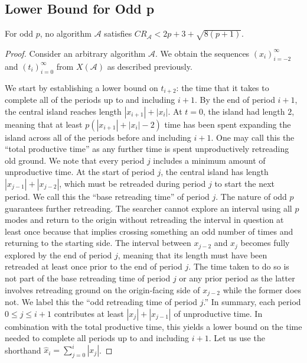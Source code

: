 \subsection{Lower Bound for Odd p}
\begin{theorem} 
    For odd $p$, no algorithm $\mathcal{A}$ satisfies $CR_{\mathcal{A}} < 2p+3+\sqrt{8(p+1)}$.
\end{theorem}
\begin{proof}
  Consider an arbitrary algorithm $\mathcal{A}$. We obtain the sequences $\left(x_i\right)_{i=-2}^{\infty}$ and $\left(t_i\right)_{i=0}^{\infty}$ from $X(\mathcal{A})$ as described previously.  
  
  We start by establishing a lower bound on $t_{i+2}$: the time that it takes to complete all of the periods up to and including $i+1$. By the end of period $i+1$, the central island reaches length $|x_{i+1}|+|x_i|$. At $t=0$, the island had length $2$, meaning that at least $p\left(|x_{i+1}|+|x_i|-2\right)$ time has been spent expanding the island across all of the periods before and including $i+1$. One may call this the ``total productive time'' as any further time is spent unproductively retreading old ground. We note that every period $j$ includes a minimum amount of unproductive time. At the start of period $j$, the central island has length $|x_{j-1}|+|x_{j-2}|$, which must be retreaded during period $j$ to start the next period. We call this the ``base retreading time'' of period $j$. The nature of odd $p$ guarantees further retreading. The searcher cannot explore an interval using all $p$ modes and return to the origin without retreading the interval in question at least once because that implies crossing something an odd number of times and returning to the starting side. The interval between $x_{j-2}$ and $x_j$ becomes fully explored by the end of period $j$, meaning that its length must have been retreaded at least once prior to the end of period $j$. The time taken to do so is not part of the base retreading time of period $j$ or any prior period as the latter involves retreading ground on the origin-facing side of $x_{j-2}$ while the former does not. We label this the ``odd retreading time of period $j$.'' In summary, each period $0\leq j\leq i+1$ contributes at least $|x_{j}|+|x_{j-1}|$ of unproductive time. In combination with the total productive time, this yields a lower bound on the time needed to complete all periods up to and including $i+1$. Let us use the shorthand $\hat{x}_i = \sum_{j=0}^{i}|x_j|$.

\end{proof}
